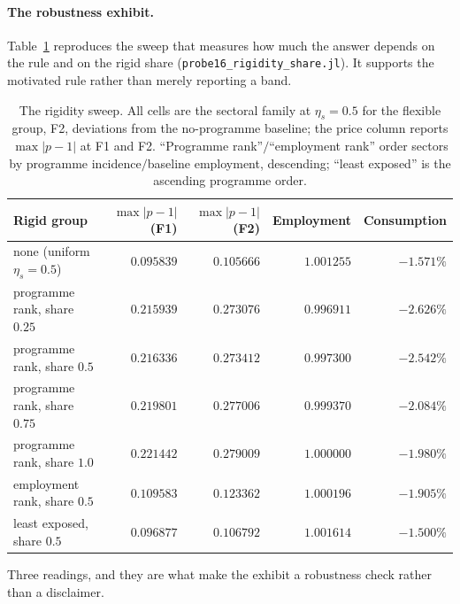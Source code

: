 \documentclass[11pt]{article}
\begin{document}
\paragraph{The robustness exhibit.} Table~\ref{tab:band} reproduces the sweep
that measures how much the answer depends on the rule and on the rigid share
(\texttt{probe16\_rigidity\_share.jl}). It supports the motivated rule rather
than merely reporting a band.

\begin{table}[htbp]
\centering
\caption{The rigidity sweep. All cells are the sectoral family at
$\eta_s = 0.5$ for the flexible group, F2, deviations from the no-programme
baseline; the price column reports $\max|p-1|$ at F1 and F2. ``Programme
rank''$/$``employment rank'' order sectors by programme incidence$/$baseline
employment, descending; ``least exposed'' is the ascending programme order.}
\label{tab:band}
\begin{tabular}{lrrrr}
\toprule
Rigid group & $\max|p-1|$ (F1) & $\max|p-1|$ (F2) & Employment & Consumption \\
\midrule
none (uniform $\eta_s = 0.5$) & $0.095839$ & $0.105666$ & $1.001255$ & $-1.571\%$ \\
programme rank, share $0.25$ & $0.215939$ & $0.273076$ & $0.996911$ & $-2.626\%$ \\
programme rank, share $0.5$  & $0.216336$ & $0.273412$ & $0.997300$ & $-2.542\%$ \\
programme rank, share $0.75$ & $0.219801$ & $0.277006$ & $0.999370$ & $-2.084\%$ \\
programme rank, share $1.0$  & $0.221442$ & $0.279009$ & $1.000000$ & $-1.980\%$ \\
employment rank, share $0.5$ & $0.109583$ & $0.123362$ & $1.000196$ & $-1.905\%$ \\
least exposed, share $0.5$   & $0.096877$ & $0.106792$ & $1.001614$ & $-1.500\%$ \\
\bottomrule
\end{tabular}
\end{table}

Three readings, and they are what make the exhibit a robustness check rather
than a disclaimer.
\end{document}
